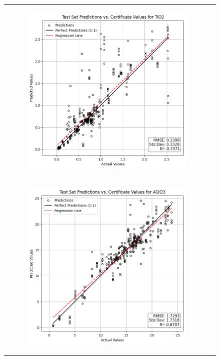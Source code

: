 \begin{figure}
{\begin{tabular}{cc}
\begin{subfigure}{0.5\textwidth}
                \includegraphics[width=\textwidth]{images/one_to_one/svr/TiO2.png}
            \end{subfigure} \\
            \begin{subfigure}{0.5\textwidth}
                \includegraphics[width=\textwidth]{images/one_to_one/svr/Al2O3.png}

\end{subfigure}
\end{tabular}}
\end{figure}

